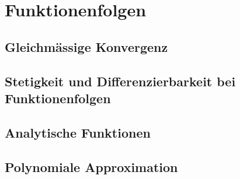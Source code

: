 \chapter{Funktionenfolgen}
\section{Gleichmässige Konvergenz}
\section{Stetigkeit und Differenzierbarkeit bei Funktionenfolgen}
\section{Analytische Funktionen}
\section{Polynomiale Approximation}
